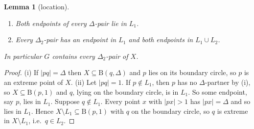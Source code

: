 \documentclass[11pt]{amsart}
\newtheorem{lemma}[theorem]{Lemma}
\theoremstyle{definition}
\theoremstyle{remark}
\newcommand{\Dt}{\Delta_2}
\newcommand{\Dd}{\mathrm{B}}      %
\begin{document}
\begin{lemma}[location]\label{lem:location}
\begin{enumerate}[label=(\roman*)]
\item Both endpoints of every $\Delta$-pair lie in $L_1$.
\item Every $\Dt$-pair has an endpoint in $L_1$ and both endpoints in $L_1\cup L_2$.
\end{enumerate}
In particular $G$ contains every $\Dt$-pair of $X$.
\end{lemma}
\begin{proof}
(i) If $|pq|=\Delta$ then $X\subseteq\Dd(q,\Delta)$ and $p$ lies on its boundary circle, so $p$ is an extreme point of $X$. (ii) Let $|pq|=1$. If $p\notin L_1$, then $p$ has no $\Delta$-partner by (i), so $X\subseteq\Dd(p,1)$ and $q$, lying on the boundary circle, is in $L_1$. So some endpoint, say $p$, lies in $L_1$. Suppose $q\notin L_1$. Every point $x$ with $|px|>1$ has $|px|=\Delta$ and so lies in $L_1$. Hence $X\setminus L_1\subseteq\Dd(p,1)$ with $q$ on the boundary circle, so $q$ is extreme in $X\setminus L_1$, i.e.\ $q\in L_2$.
\end{proof}
\end{document}

